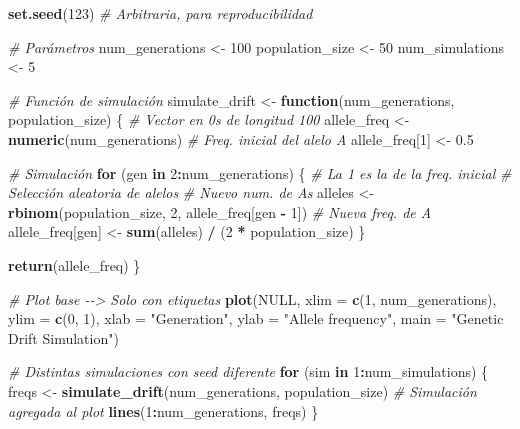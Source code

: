\documentclass[
  11pt,
]{article}
\newenvironment{Shaded}{\begin{snugshade}}{\end{snugshade}}
\newcommand{\AttributeTok}[1]{\textcolor[rgb]{0.13,0.29,0.53}{#1}}
\newcommand{\CommentTok}[1]{\textcolor[rgb]{0.56,0.35,0.01}{\textit{#1}}}
\newcommand{\ConstantTok}[1]{\textcolor[rgb]{0.56,0.35,0.01}{#1}}
\newcommand{\ControlFlowTok}[1]{\textcolor[rgb]{0.13,0.29,0.53}{\textbf{#1}}}
\newcommand{\DecValTok}[1]{\textcolor[rgb]{0.00,0.00,0.81}{#1}}
\newcommand{\FloatTok}[1]{\textcolor[rgb]{0.00,0.00,0.81}{#1}}
\newcommand{\FunctionTok}[1]{\textcolor[rgb]{0.13,0.29,0.53}{\textbf{#1}}}
\newcommand{\NormalTok}[1]{#1}
\newcommand{\OtherTok}[1]{\textcolor[rgb]{0.56,0.35,0.01}{#1}}
\newcommand{\SpecialCharTok}[1]{\textcolor[rgb]{0.81,0.36,0.00}{\textbf{#1}}}
\newcommand{\StringTok}[1]{\textcolor[rgb]{0.31,0.60,0.02}{#1}}
\begin{document}
\begin{Shaded}
\begin{Highlighting}[]
\FunctionTok{set.seed}\NormalTok{(}\DecValTok{123}\NormalTok{) }\CommentTok{\# Arbitraria, para reproducibilidad}

\CommentTok{\# Parámetros}
\NormalTok{num\_generations }\OtherTok{\textless{}{-}} \DecValTok{100}
\NormalTok{population\_size }\OtherTok{\textless{}{-}} \DecValTok{50}
\NormalTok{num\_simulations }\OtherTok{\textless{}{-}} \DecValTok{5}

\CommentTok{\# Función de simulación}
\NormalTok{simulate\_drift }\OtherTok{\textless{}{-}} \ControlFlowTok{function}\NormalTok{(num\_generations, population\_size) \{}
  \CommentTok{\# Vector en 0s de longitud 100}
\NormalTok{  allele\_freq }\OtherTok{\textless{}{-}} \FunctionTok{numeric}\NormalTok{(num\_generations)}
  \CommentTok{\# Freq. inicial del alelo A}
\NormalTok{  allele\_freq[}\DecValTok{1}\NormalTok{] }\OtherTok{\textless{}{-}} \FloatTok{0.5}

  \CommentTok{\# Simulación}
  \ControlFlowTok{for}\NormalTok{ (gen }\ControlFlowTok{in} \DecValTok{2}\SpecialCharTok{:}\NormalTok{num\_generations) \{ }\CommentTok{\# La 1 es la de la freq. inicial}
    \CommentTok{\# Selección aleatoria de alelos}
    \CommentTok{\# Nuevo num. de A\textquotesingle{}s}
\NormalTok{    alleles }\OtherTok{\textless{}{-}} \FunctionTok{rbinom}\NormalTok{(population\_size, }\DecValTok{2}\NormalTok{, allele\_freq[gen }\SpecialCharTok{{-}} \DecValTok{1}\NormalTok{])}
    \CommentTok{\# Nueva freq. de A}
\NormalTok{    allele\_freq[gen] }\OtherTok{\textless{}{-}} \FunctionTok{sum}\NormalTok{(alleles) }\SpecialCharTok{/}\NormalTok{ (}\DecValTok{2} \SpecialCharTok{*}\NormalTok{ population\_size)}
\NormalTok{  \}}

  \FunctionTok{return}\NormalTok{(allele\_freq)}
\NormalTok{\}}

\CommentTok{\# Plot base {-}{-}\textgreater{} Solo con etiquetas}
\FunctionTok{plot}\NormalTok{(}\ConstantTok{NULL}\NormalTok{,}
  \AttributeTok{xlim =} \FunctionTok{c}\NormalTok{(}\DecValTok{1}\NormalTok{, num\_generations),}
  \AttributeTok{ylim =} \FunctionTok{c}\NormalTok{(}\DecValTok{0}\NormalTok{, }\DecValTok{1}\NormalTok{),}
  \AttributeTok{xlab =} \StringTok{"Generation"}\NormalTok{,}
  \AttributeTok{ylab =} \StringTok{"Allele frequency"}\NormalTok{,}
  \AttributeTok{main =} \StringTok{"Genetic Drift Simulation"}\NormalTok{)}

\CommentTok{\# Distintas simulaciones con seed diferente}
\ControlFlowTok{for}\NormalTok{ (sim }\ControlFlowTok{in} \DecValTok{1}\SpecialCharTok{:}\NormalTok{num\_simulations) \{}
\NormalTok{  freqs }\OtherTok{\textless{}{-}} \FunctionTok{simulate\_drift}\NormalTok{(num\_generations, population\_size)}
  \CommentTok{\# Simulación agregada al plot}
  \FunctionTok{lines}\NormalTok{(}\DecValTok{1}\SpecialCharTok{:}\NormalTok{num\_generations, freqs)}
\NormalTok{\}}
\end{Highlighting}
\end{Shaded}
\end{document}
